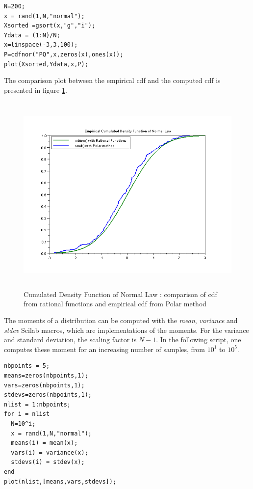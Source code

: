 \lstset{language=Scilab}
\lstset{numbers=left}
\lstset{basicstyle=\footnotesize}
\begin{lstlisting}
N=200;
x = rand(1,N,"normal");
Xsorted =gsort(x,"g","i"); 
Ydata = (1:N)/N;
x=linspace(-3,3,100);
P=cdfnor("PQ",x,zeros(x),ones(x));
plot(Xsorted,Ydata,x,P);
\end{lstlisting}

The comparison plot between the empirical cdf and the 
computed cdf is presented in figure \ref{introduction_ecdcomparison}.

\begin{figure}[htbp]
\begin{center}
\includegraphics[height=10cm]{introduction_ecdfcomparison.png}
\end{center}
\caption{Cumulated Density Function of Normal Law : comparison of cdf from 
rational functions and empirical cdf from Polar method }
\label{introduction_ecdcomparison}
\end{figure}

The moments of a distribution can be computed with the 
\emph{mean}, \emph{variance} and \emph{stdev} Scilab macros,
which are implementations of the moments. For the variance
and standard deviation, the scaling factor is $N-1$.
In the following script, one computes these moment for 
an increasing number of samples, from $10^1$ to $10^5$.

\lstset{language=Scilab}
\lstset{numbers=left}
\lstset{basicstyle=\footnotesize}
\begin{lstlisting}
nbpoints = 5;
means=zeros(nbpoints,1);
vars=zeros(nbpoints,1);
stdevs=zeros(nbpoints,1);
nlist = 1:nbpoints;
for i = nlist
  N=10^i;
  x = rand(1,N,"normal");
  means(i) = mean(x);
  vars(i) = variance(x);
  stdevs(i) = stdev(x);
end
plot(nlist,[means,vars,stdevs]);
\end{lstlisting}

